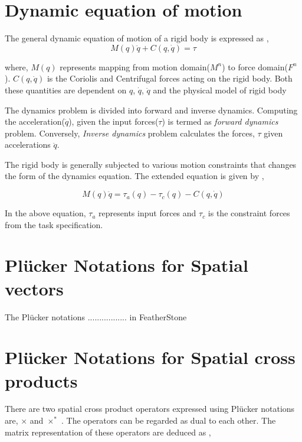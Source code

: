 \chapter{Dynamic equation of motion}\label{chap:dynamic}
The general dynamic equation of motion of a rigid body is expressed as \cite{featherstone2014rigid} \cite{shakhimardanov2015composable}, 
\begin{equation}
	\label{eq:dynamic}
	M(q)\ddot{q} + C(q, \dot{q}) = \tau 
\end{equation}

where, $M(q)$ represents mapping from motion domain($M^n$) to force domain($F^n$). $C(q, \dot{q})$ is the Coriolis and Centrifugal forces acting on the rigid body. Both these quantities are dependent on $q$, $\dot{q}$, $\ddot{q}$ and the physical model of rigid body \cite{featherstone2014rigid}

The dynamics problem is divided into forward and inverse dynamics. Computing the acceleration($\ddot{q}$), given the input forces($\tau$) is termed as \textit{forward dynamics} problem. Conversely, \textit{Inverse dynamics} problem calculates the forces, $\tau$ given accelerations $\ddot{q}$.

The rigid body is generally subjected to various motion constraints that changes the form of the dynamics equation. The extended equation is given by \cite{shakhimardanov2015composable},

\begin{equation}
\label{eq:extendeddynamic}
M(q)\ddot{q} = \tau_a(q) - \tau_c(q) -  C(q, \dot{q})
\end{equation}

In the above equation, $\tau_a$ represents input forces and $\tau_c$ is the constraint forces from the task specification.

\chapter{Pl{\"u}cker Notations for Spatial vectors}\label{chap:plucker}

The Pl{\"u}cker notations  ................. in FeatherStone

\chapter{Pl{\"u}cker Notations for Spatial cross products}\label{chap:cross}

There are two spatial cross product operators expressed using Pl{\"u}cker notations are, $\times$ and $\times^*$ \cite{featherstone2014rigid}. The operators can be regarded as dual to each other. The matrix representation of these operators are deduced as \cite{featherstone2014rigid},

